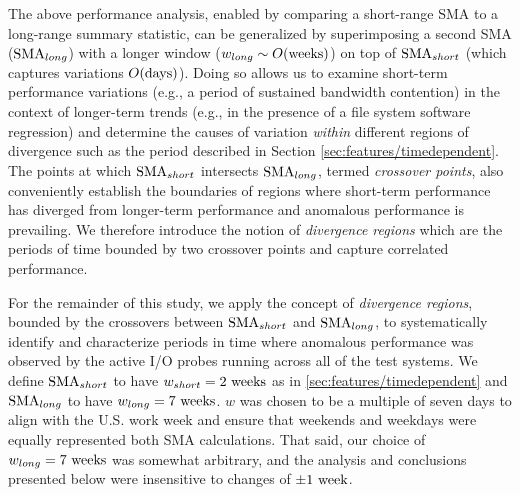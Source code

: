 The above performance analysis, enabled by comparing a short-range SMA to a long-range summary statistic, can be generalized by superimposing a second SMA ($\textup{SMA}_{long}$) with a longer window (${w_{long} \sim O(\textup{weeks})}$) on top of $\textup{SMA}_{short}$ (which captures variations ${O(\textup{days})}$).
Doing so allows us to examine short-term performance variations (e.g., a period of sustained bandwidth contention) in the context of longer-term trends (e.g., in the presence of a file system software regression) and determine the causes of variation \emph{within} different regions of divergence such as the period described in Section \ref{sec:features/timedependent}.
The points at which $\textup{SMA}_{short}$ intersects $\textup{SMA}_{long}$, termed \emph{crossover points}, also conveniently establish the boundaries of regions where short-term performance has diverged from longer-term performance and anomalous performance is prevailing.
We therefore introduce the notion of \emph{divergence regions} which are the periods of time bounded by two crossover points and capture correlated performance.

For the remainder of this study, we apply the concept of \emph{divergence regions}, bounded by the crossovers between $\textup{SMA}_{short}$ and $\textup{SMA}_{long}$, to systematically identify and characterize periods in time where anomalous performance was observed by the active I/O probes running across all of the test systems.
We define $\textup{SMA}_{short}$ to have $w_{short} = 2 \textup{ weeks}$ as in \ref{sec:features/timedependent} and $\textup{SMA}_{long}$ to have $w_{long} = 7 \textup{ weeks}$.
$w$ was chosen to be a multiple of seven days to align with the U.S. work week and ensure that weekends and weekdays were equally represented both SMA calculations.
That said, our choice of $w_{long} = 7 \textup{ weeks}$ was somewhat arbitrary, and the analysis and conclusions presented below were insensitive to changes of $\pm 1 \textup{ week}$.